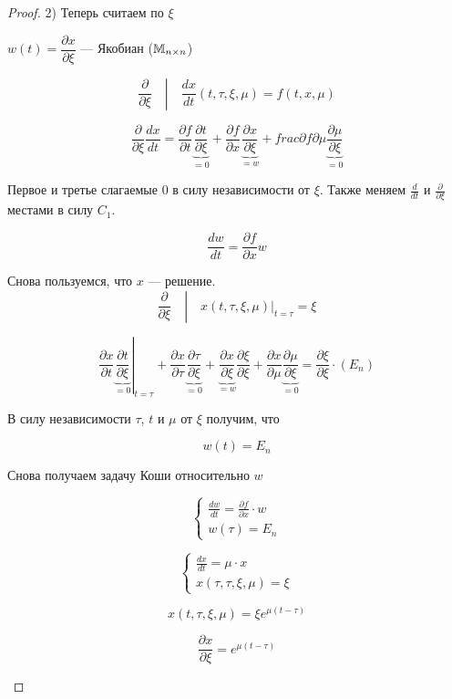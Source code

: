 \begin{proof}
  2) Теперь считаем по $\xi$

  $w(t) = \dfrac{\partial x}{\partial \xi}$ --- Якобиан ($\mathbb{M}_{n \times n}$)

  $$\left. \frac{\partial}{\partial \xi}\quad \right| \quad \frac{dx}{dt}(t, \tau, \xi, \mu) = f(t, x, \mu)$$

  $$\frac{\partial}{\partial \xi} \frac{dx}{dt} =
  \frac{\partial f}{\partial t} \underbrace{\frac{\partial t}{\partial \xi}}_{= 0} +
  \frac{\partial f}{\partial x} \underbrace{\frac{\partial x}{\partial \xi}}_{= w} +
  frac{\partial f}{\partial \mu} \underbrace{\frac{\partial \mu}{\partial \xi}}_{=0}$$
  
  Первое и третье слагаемые 0 в силу независимости от $\xi$. Также меняем $\frac{d}{dt}$ и $\frac{\partial}{\partial \xi}$ местами в силу $C_1$.
  
  $$\frac{dw}{dt} = \frac{\partial f}{\partial x}w$$
  
  Снова пользуемся, что $x$ --- решение.
  $$\left. \frac{\partial}{\partial \xi}\quad \right| \quad x(t, \tau, \xi,\mu) |_{t = \tau} = \xi$$
  
  $$\left.\frac{\partial x}{\partial t} \underbrace{\frac{\partial t}{\partial \xi}}_{=0} \right|_{t = \tau} +
  \frac{\partial x}{\partial \tau} \underbrace{\frac{\partial \tau}{\partial \xi}}_{=0}  +
  \underbrace{\frac{\partial x}{\partial \xi}}_{= w} \frac{\partial \xi}{\partial \xi} +
  \frac{\partial x}{\partial \mu} \underbrace{\frac{\partial \mu}{\partial \xi}}_{=0}  =
  \frac{\partial \xi}{\partial \xi} \cdot (E_n)$$
  
  В силу независимости $\tau$, $t$ и $\mu$ от $\xi$ получим, что

  $$w(t) = E_n$$

  Снова получаем задачу Коши относительно $w$

  $$
  \begin{cases}
    \frac{dw}{dt} = \frac{\partial f}{\partial x} \cdot w \\
    w(\tau) = E_n
  \end{cases}
  $$

  \begin{example}
    $$
    \begin{cases}
      \frac{dx}{dt} = \mu \cdot x \\
      x(\tau, \tau, \xi, \mu) = \xi
    \end{cases}
    $$
  
    $$x(t, \tau, \xi, \mu) = \xi e^{\mu(t - \tau)}$$
  
    $$\frac{\partial x}{\partial \xi} = e^{\mu(t - \tau)}$$
  

\end{example}
\end{proof}

